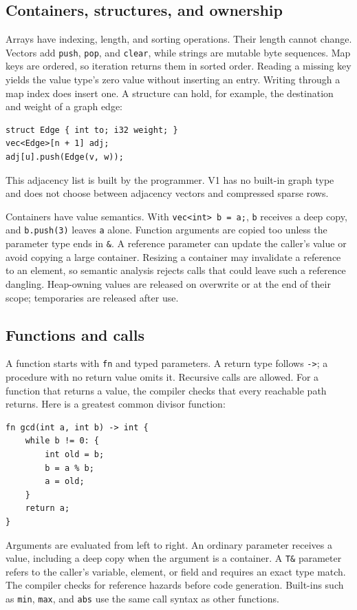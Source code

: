 \documentclass[12pt,a4paper]{report}
\begin{document}
\subsection{Containers, structures, and ownership}
Arrays have indexing, length, and sorting operations. Their length cannot change. Vectors add \texttt{push}, \texttt{pop}, and \texttt{clear}, while strings are mutable byte sequences. Map keys are ordered, so iteration returns them in sorted order. Reading a missing key yields the value type's zero value without inserting an entry. Writing through a map index does insert one. A structure can hold, for example, the destination and weight of a graph edge:
\begin{verbatim}
struct Edge { int to; i32 weight; }
vec<Edge>[n + 1] adj;
adj[u].push(Edge(v, w));
\end{verbatim}
This adjacency list is built by the programmer. V1 has no built-in graph type and does not choose between adjacency vectors and compressed sparse rows.

Containers have value semantics. With \texttt{vec<int> b = a;}, \texttt{b} receives a deep copy, and \texttt{b.push(3)} leaves \texttt{a} alone. Function arguments are copied too unless the parameter type ends in \texttt{\&}. A reference parameter can update the caller's value or avoid copying a large container. Resizing a container may invalidate a reference to an element, so semantic analysis rejects calls that could leave such a reference dangling. Heap-owning values are released on overwrite or at the end of their scope; temporaries are released after use.

\subsection{Functions and calls}
A function starts with \texttt{fn} and typed parameters. A return type follows \texttt{->}; a procedure with no return value omits it. Recursive calls are allowed. For a function that returns a value, the compiler checks that every reachable path returns. Here is a greatest common divisor function:
\begin{verbatim}
fn gcd(int a, int b) -> int {
    while b != 0: {
        int old = b;
        b = a % b;
        a = old;
    }
    return a;
}
\end{verbatim}
Arguments are evaluated from left to right. An ordinary parameter receives a value, including a deep copy when the argument is a container. A \texttt{T\&} parameter refers to the caller's variable, element, or field and requires an exact type match. The compiler checks for reference hazards before code generation. Built-ins such as \texttt{min}, \texttt{max}, and \texttt{abs} use the same call syntax as other functions.
\end{document}
